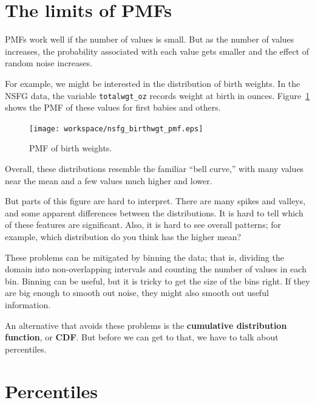 \documentclass[12pt]{book}
\begin{document}
\section{The limits of PMFs}

PMFs work well if the number of values is small.  But as the
number of values increases, the probability associated with each value
gets smaller and the effect of random noise increases.

For example, we might be interested in the distribution of birth
weights.  In the NSFG data, the variable \verb"totalwgt_oz" records
weight at birth in ounces.  Figure~\ref{nsfg_birthwgt_pmf} shows the
PMF of these values for first babies and others.


\begin{figure}
\centerline{\texttt{[image: workspace/nsfg\_birthwgt\_pmf.eps]}}
\caption{PMF of birth weights.}
\label{nsfg_birthwgt_pmf}
\end{figure}

Overall, these distributions resemble the familiar ``bell curve,'' with
many values near the mean and a few values much higher and lower.

But parts of this figure are hard to interpret.  There are many spikes
and valleys, and some apparent differences between the distributions.
It is hard to tell which of these features are significant.  Also, it
is hard to see overall patterns; for example, which distribution do
you think has the higher mean?


These problems can be mitigated by binning the data;
that is, dividing the domain into non-overlapping intervals and counting
the number of values in each bin.  Binning can be useful, but it is
tricky to get the size of the bins right.  If they are big enough to
smooth out noise, they might also smooth out useful information.

An alternative that avoids these problems is the {\bf cumulative
distribution function}, or {\bf CDF}.  But before we can get to that,
we have to talk about percentiles.



\section{Percentiles}
\end{document}
